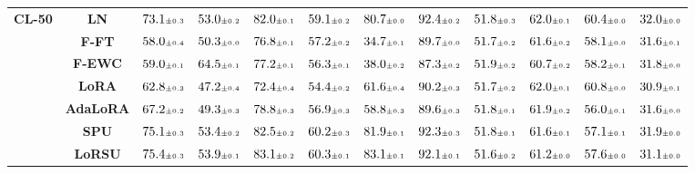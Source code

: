 \begin{table}
\begin{center}
\begin{small}
\begin{tabular}{l c c c c c c c c c c c}
\midrule
\multirow{7}{*}{\textbf{CL-50}} & \textbf{LN} & $73.1 \mtiny{\pm 0.3}$ & $53.0 \mtiny{\pm 0.2}$ & $82.0 \mtiny{\pm 0.1}$ & $59.1 \mtiny{\pm 0.2}$ & $80.7 \mtiny{\pm 0.0}$ & $92.4 \mtiny{\pm 0.2}$ & $51.8 \mtiny{\pm 0.3}$ & $62.0 \mtiny{\pm 0.1}$ & $60.4 \mtiny{\pm 0.0}$ & $32.0 \mtiny{\pm 0.0}$ \\
& \textbf{F-FT} & $58.0 \mtiny{\pm 0.4}$ & $50.3 \mtiny{\pm 0.0}$ & $76.8 \mtiny{\pm 0.1}$ & $57.2 \mtiny{\pm 0.2}$ & $34.7 \mtiny{\pm 0.1}$ & $89.7 \mtiny{\pm 0.0}$ & $51.7 \mtiny{\pm 0.2}$ & $61.6 \mtiny{\pm 0.2}$ & $58.1 \mtiny{\pm 0.0}$ & $31.6 \mtiny{\pm 0.1}$ \\
& \textbf{F-EWC} & $59.0 \mtiny{\pm 0.1}$ & $64.5 \mtiny{\pm 0.1}$ & $77.2 \mtiny{\pm 0.1}$ & $56.3 \mtiny{\pm 0.1}$ & $38.0 \mtiny{\pm 0.2}$ & $87.3 \mtiny{\pm 0.2}$ & $51.9 \mtiny{\pm 0.2}$ & $60.7 \mtiny{\pm 0.2}$ & $58.2 \mtiny{\pm 0.1}$ & $31.8 \mtiny{\pm 0.0}$ \\
& \textbf{LoRA} & $62.8 \mtiny{\pm 0.3}$ & $47.2 \mtiny{\pm 0.4}$ & $72.4 \mtiny{\pm 0.4}$ & $54.4 \mtiny{\pm 0.2}$ & $61.6 \mtiny{\pm 0.4}$ & $90.2 \mtiny{\pm 0.3}$ & $51.7 \mtiny{\pm 0.2}$ & $62.0 \mtiny{\pm 0.1}$ & $60.8 \mtiny{\pm 0.0}$ & $30.9 \mtiny{\pm 0.1}$ \\
& \textbf{AdaLoRA} & $67.2 \mtiny{\pm 0.2}$ & $49.3 \mtiny{\pm 0.3}$ & $78.8 \mtiny{\pm 0.3}$ & $56.9 \mtiny{\pm 0.3}$ & $58.8 \mtiny{\pm 0.3}$ & $89.6 \mtiny{\pm 0.3}$ & $51.8 \mtiny{\pm 0.1}$ & $61.9 \mtiny{\pm 0.2}$ & $56.0 \mtiny{\pm 0.1}$ & $31.6 \mtiny{\pm 0.0}$ \\
& \textbf{SPU} & $75.1 \mtiny{\pm 0.3}$ & $53.4 \mtiny{\pm 0.2}$ & $82.5 \mtiny{\pm 0.2}$ & $60.2 \mtiny{\pm 0.3}$ & $81.9 \mtiny{\pm 0.1}$ & $92.3 \mtiny{\pm 0.3}$ & $51.8 \mtiny{\pm 0.1}$ & $61.6 \mtiny{\pm 0.1}$ & $57.1 \mtiny{\pm 0.1}$ & $31.9 \mtiny{\pm 0.0}$ \\
& \textbf{LoRSU} & $75.4 \mtiny{\pm 0.3}$ & $53.9 \mtiny{\pm 0.1}$ & $83.1 \mtiny{\pm 0.2}$ & $60.3 \mtiny{\pm 0.1}$ & $83.1 \mtiny{\pm 0.1}$ & $92.1 \mtiny{\pm 0.1}$ & $51.6 \mtiny{\pm 0.2}$ & $61.2 \mtiny{\pm 0.0}$ & $57.6 \mtiny{\pm 0.0}$ & $31.1 \mtiny{\pm 0.0}$ \\
\bottomrule
\end{tabular}
\endgroup
\end{small}
\end{center}
\vskip -0.1in
\end{table}